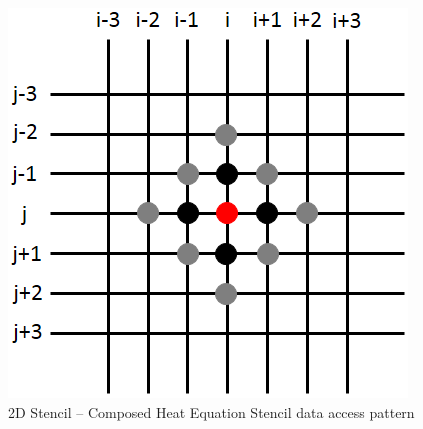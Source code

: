 \documentclass{acm_proc_article-sp}
\begin{document}
\begin{figure}[ht!]
  \centering
  \includegraphics[scale=0.5]{pics/stencil_grid/2d-s02}
  \caption{2D Stencil -- Composed Heat Equation Stencil data access pattern}
  \label{pic:2d-s02}
\end{figure}
\end{document}
